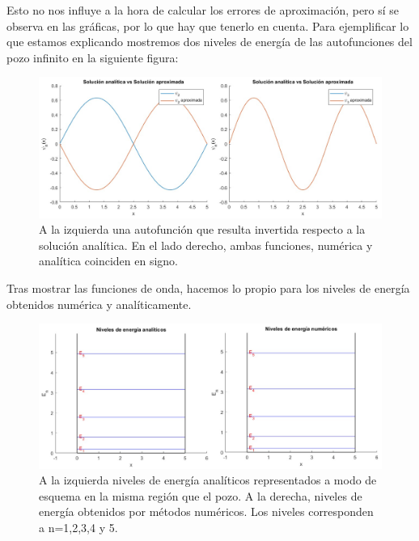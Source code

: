 \documentclass[12pt]{article}
\begin{document}
Esto no nos influye a la hora de calcular los errores de aproximación, pero sí se observa en las gráficas, por lo que hay que tenerlo en cuenta. Para ejemplificar lo que estamos explicando mostremos dos niveles de energía de las autofunciones del pozo infinito en la siguiente figura:




\begin{figure}[H]
    \centering
    \begin{adjustbox}{width=1.1\linewidth,center}
        \includegraphics{fotos/autofunciones_invertidas.png}
    \end{adjustbox}
    \caption{A la izquierda una autofunción que resulta invertida respecto a la solución analítica. En el lado derecho, ambas funciones, numérica y analítica coinciden en signo.}
\end{figure}

Tras mostrar las funciones de onda, hacemos lo propio para los niveles de energía obtenidos numérica y analíticamente.

\begin{figure}[H]
    \centering
    \begin{adjustbox}{width=1.2\linewidth,center}
        \includegraphics{fotos/comp_energias_infinito.png}
    \end{adjustbox}
    \caption{A la izquierda niveles de energía analíticos representados a modo de esquema en la misma región que el pozo. A la derecha, niveles de energía obtenidos por métodos numéricos. Los niveles corresponden a n=1,2,3,4 y 5.}
\end{figure}
\end{document}
